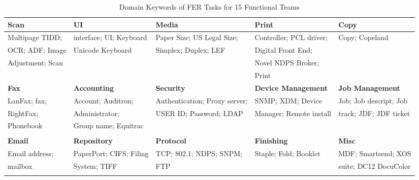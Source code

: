 \documentclass[sigconf]{acmart}
\begin{document}
\begin{table*}[]
    \centering
    \begin{tabular}{|l|l|l|l|l|}
    \hline
\textbf{Scan} & \textbf{UI} & \textbf{Media} & \textbf{Print} & \textbf{Copy} \\ \hline
Multipage TIDD; & interface; UI; Keyboard & Paper Size; US Legal Size; & Controller; PCL driver; & Copy; Copeland\\
OCR; ADF; Image & Unicode Keyboard & Simplex; Duplex; LEF & Digital Front End;&  \\
Adjustment; Scan & &  & Novel NDPS Broker; & \\
& & & Print &  \\
\hline

\textbf{Fax} & \textbf{Accounting} & \textbf{Security} & \textbf{Device Management} & \textbf{Job Management} \\  
\hline
LanFax; fax;  & Account; Auditron; & Authentication; Proxy server; & SNMP; XDM; Device  & Job; Job descript; Job \\ 
RightFax; & Administrator; &  USER ID; Password; LDAP & Manager; Remote install& track; JDF; JDF ticket \\
Phonebook & Group name; Equitrac & & & \\
 & & & & \\ \hline
 \textbf{Email} & \textbf{Repository} & \textbf{Protocol} & \textbf{Finishing} & \textbf{Misc} \\
 \hline
 Email address; & PaperPort; CIFS; Filing & TCP; 802.1; NDPS; SNPM; & Staple; Fold; Booklet & MDF; Smartsend; XOS \\
 mailbox & System; TIFF & FTP & & suite; DC12 DocuColor\\
& & & & \\ \hline

    \end{tabular}
    \caption{Domain Keywords of FER Tasks for 15 Functional Teams}
    \label{tab:2}
\end{table*}
\end{document}
